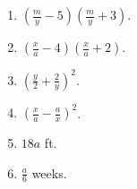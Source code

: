 \documentclass{book}
\begin{document}
\begin{enumerate}
\item $\displaystyle
\left(\frac{m}{y}-5\right)\left(\frac{m}{y}+3\right)$.

\item $\displaystyle
\left(\frac{x}{a}-4\right)\left(\frac{x}{a}+2\right)$.

\item $\displaystyle \left(\frac{y}{2}+\frac{2}{y}\right)^2$.

\item $\displaystyle \left(\frac{x}{a}-\frac{a}{x}\right)^2$.

\item $18a$ ft.

\item $\displaystyle \frac{a}{6}$ weeks.
\end{enumerate}
\end{document}
